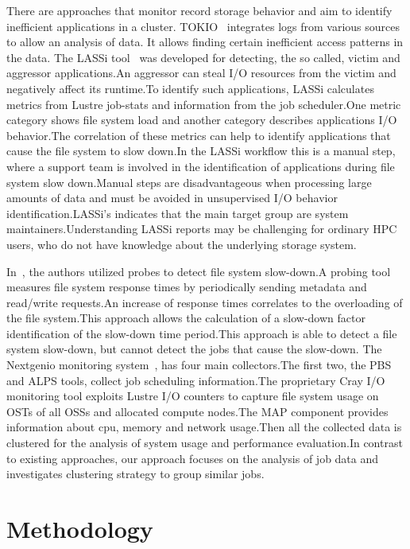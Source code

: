 \documentclass{jhps}
\begin{document}
There are approaches that monitor record storage behavior and aim to identify inefficient applications in a cluster.
TOKIO~\cite{lockwood2018tokio} integrates logs from various sources to allow an analysis of data.
It allows finding certain inefficient access patterns in the data.
The LASSi tool~\cite{DBLP:journals/corr/abs-1906-03884} was developed for detecting, the so called, victim and aggressor applications.An aggressor can steal I/O resources from the victim and negatively affect its runtime.To identify such applications, LASSi calculates metrics from Lustre job-stats and information from the job scheduler.One metric category shows file system load and another category describes applications I/O behavior.The correlation of these metrics can help to identify applications that cause the file system to slow down.In the LASSi workflow this is a manual step, where a support team is involved in the identification of applications during file system slow down.Manual steps are disadvantageous when processing large amounts of data and must be avoided in unsupervised I/O behavior identification.LASSi's indicates that the main target group are system maintainers.Understanding LASSi reports may be challenging for ordinary HPC users, who do not have knowledge about the underlying storage system.

In~\cite{TUISVPKB19}, the authors utilized probes to detect file system slow-down.A probing tool measures file system response times by periodically sending metadata and read/write requests.An increase of response times correlates to the overloading of the file system.This approach allows the calculation of a slow-down factor identification of the slow-down time period.This approach is able to detect a file system slow-down, but cannot detect the jobs that cause the slow-down.
The Nextgenio monitoring system~\cite{nextgenio2016}, has four main collectors.The first two, the PBS and ALPS tools, collect job scheduling information.The proprietary Cray I/O monitoring tool exploits Lustre I/O counters to capture file system usage on OSTs of all OSSs and allocated compute nodes.The MAP component provides information about cpu, memory and network usage.Then all the collected data is clustered for the analysis of system usage and performance evaluation.In contrast to existing approaches, our approach focuses on the analysis of job data and investigates clustering strategy to group similar jobs.

\section{Methodology}
\end{document}
